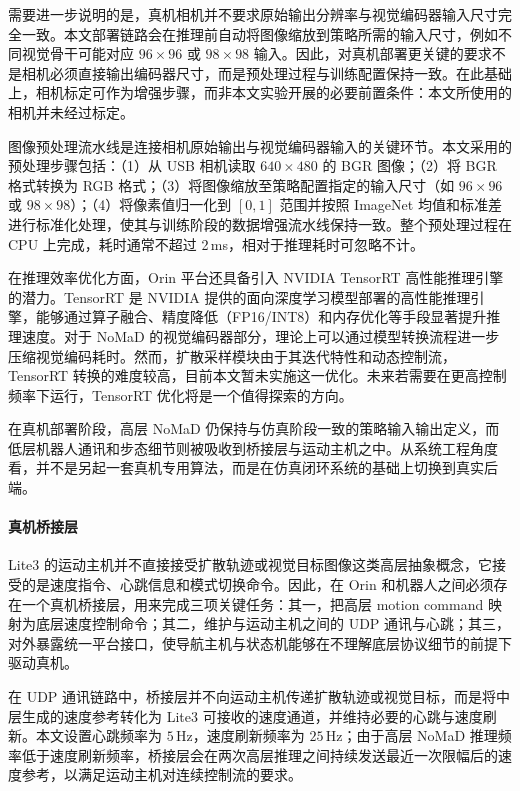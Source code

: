 需要进一步说明的是，真机相机并不要求原始输出分辨率与视觉编码器输入尺寸完全一致。本文部署链路会在推理前自动将图像缩放到策略所需的输入尺寸，例如不同视觉骨干可能对应 $96\times96$ 或 $98\times98$ 输入。因此，对真机部署更关键的要求不是相机必须直接输出编码器尺寸，而是预处理过程与训练配置保持一致。在此基础上，相机标定可作为增强步骤，而非本文实验开展的必要前置条件：本文所使用的相机并未经过标定。


图像预处理流水线是连接相机原始输出与视觉编码器输入的关键环节。本文采用的预处理步骤包括：（1）从 USB 相机读取 $640\times480$ 的 BGR
图像；（2）将 BGR 格式转换为 RGB 格式；（3）将图像缩放至策略配置指定的输入尺寸（如 $96\times96$ 或
$98\times98$）；（4）将像素值归一化到 $[0,1]$ 范围并按照 ImageNet
均值和标准差进行标准化处理，使其与训练阶段的数据增强流水线保持一致。整个预处理过程在 CPU 上完成，耗时通常不超过 2\,ms，相对于推理耗时可忽略不计。

在推理效率优化方面，Orin 平台还具备引入 NVIDIA TensorRT 高性能推理引擎的潜力。TensorRT 是 NVIDIA
提供的面向深度学习模型部署的高性能推理引擎，能够通过算子融合、精度降低（FP16/INT8）和内存优化等手段显著提升推理速度。对于 NoMaD 的视觉编码器部分，理论上可以通过模型转换流程进一步压缩视觉编码耗时。然而，扩散采样模块由于其迭代特性和动态控制流，TensorRT 转换的难度较高，目前本文暂未实施这一优化。未来若需要在更高控制频率下运行，TensorRT
优化将是一个值得探索的方向。

在真机部署阶段，高层 NoMaD 仍保持与仿真阶段一致的策略输入输出定义，而低层机器人通讯和步态细节则被吸收到桥接层与运动主机之中。从系统工程角度看，并不是另起一套真机专用算法，而是在仿真闭环系统的基础上切换到真实后端。

\paragraph*{真机桥接层}

Lite3 的运动主机并不直接接受扩散轨迹或视觉目标图像这类高层抽象概念，它接受的是速度指令、心跳信息和模式切换命令。因此，在 Orin
和机器人之间必须存在一个真机桥接层，用来完成三项关键任务：其一，把高层 motion command 映射为底层速度控制命令；其二，维护与运动主机之间的 UDP
通讯与心跳；其三，对外暴露统一平台接口，使导航主机与状态机能够在不理解底层协议细节的前提下驱动真机。

在 UDP 通讯链路中，桥接层并不向运动主机传递扩散轨迹或视觉目标，而是将中层生成的速度参考转化为 Lite3 可接收的速度通道，并维持必要的心跳与速度刷新。本文设置心跳频率为 $5\,\text{Hz}$，速度刷新频率为 $25\,\text{Hz}$；由于高层 NoMaD 推理频率低于速度刷新频率，桥接层会在两次高层推理之间持续发送最近一次限幅后的速度参考，以满足运动主机对连续控制流的要求。

